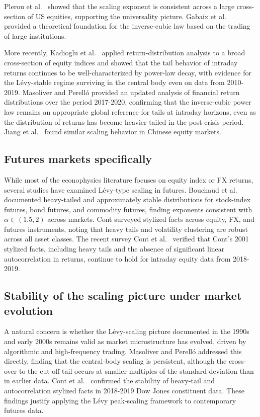 \documentclass[12pt,a4paper]{article}
\begin{document}
Plerou et al.\ \cite{Plerou1999} showed that the scaling exponent is consistent across
a large cross-section of US equities, supporting the universality picture.
Gabaix et al.\ \cite{Gabaix2003} provided a theoretical foundation for the inverse-cubic
law based on the trading of large institutions.

More recently, Kadioglu et al.\ \cite{Kadioglu2021} applied return-distribution analysis to
a broad cross-section of equity indices and showed that the tail behavior of
intraday returns continues to be well-characterized by power-law decay, with
evidence for the Lévy-stable regime surviving in the central body even on
data from 2010-2019. Masoliver and Perelló \cite{Masoliver2021} provided an updated analysis of
financial return distributions over the period 2017-2020, confirming that the
inverse-cubic power law remains an appropriate global reference for tails at
intraday horizons, even as the distribution of returns has become heavier-tailed
in the post-crisis period. Jiang et al.\ \cite{Jiang2019} found similar scaling behavior
in Chinese equity markets.

\subsection{Futures markets specifically}

While most of the econophysics literature focuses on equity index or FX
returns, several studies have examined Lévy-type scaling in futures.
Bouchaud et al.\ \cite{Bouchaud2002} documented heavy-tailed and approximately stable
distributions for stock-index futures, bond futures, and commodity futures,
finding exponents consistent with $\alpha \in (1.5, 2)$ across markets.
Cont \cite{Cont2001} surveyed stylized facts across equity, FX, and futures
instruments, noting that heavy tails and volatility clustering are robust
across all asset classes. The recent survey Cont et al.\ \cite{ContMiami2023}
verified that Cont's 2001 stylized facts, including heavy tails and the
absence of significant linear autocorrelation in returns, continue to hold
for intraday equity data from 2018-2019.

\subsection{Stability of the scaling picture under market evolution}

A natural concern is whether the Lévy-scaling picture documented in the 1990s
and early 2000s remains valid as market microstructure has evolved, driven by
algorithmic and high-frequency trading. Masoliver and Perelló \cite{Masoliver2021} addressed this
directly, finding that the central-body scaling is persistent, although the
cross-over to the cut-off tail occurs at smaller multiples of the standard
deviation than in earlier data. Cont et al.\ \cite{ContMiami2023} confirmed the
stability of heavy-tail and autocorrelation stylized facts in 2018-2019 Dow
Jones constituent data. These findings justify applying the Lévy peak-scaling
framework to contemporary futures data.
\end{document}
